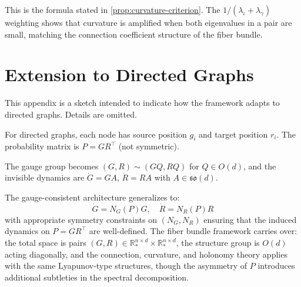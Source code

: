 \documentclass{article}
\newcommand{\RR}{\mathbb{R}}
\newcommand{\so}{\mathfrak{so}}
\theoremstyle{plain}
\theoremstyle{definition}
\theoremstyle{remark}
\begin{document}
This is the formula stated in \cref{prop:curvature-criterion}.
The $1 / (\lambda_\iota + \lambda_\gamma)$ weighting shows that curvature is amplified when both eigenvalues in a pair are small, matching the connection coefficient structure of the fiber bundle.


\section{Extension to Directed Graphs}\label{app:directed}

This appendix is a sketch intended to indicate how the framework adapts to directed graphs. Details are omitted.

For directed graphs, each node has source position $g_i$ and target position $r_i$.
The probability matrix is $P = GR^\top$ (not symmetric).

The gauge group becomes $(G, R) \sim (GQ, RQ)$ for $Q \in O(d)$, and the invisible dynamics are $\dot{G} = GA$, $\dot{R} = RA$ with $A \in \so(d)$.

The gauge-consistent architecture generalizes to:
\begin{equation}
\dot{G} = N_G(P) G, \quad \dot{R} = N_R(P) R
\end{equation}
with appropriate symmetry constraints on $(N_G, N_R)$ ensuring that the induced dynamics on $P = GR^\top$ are well-defined.
The fiber bundle framework carries over: the total space is pairs $(G, R) \in \RR_*^{n \times d} \times \RR_*^{n \times d}$, the structure group is $O(d)$ acting diagonally, and the connection, curvature, and holonomy theory applies with the same Lyapunov-type structures, though the asymmetry of $P$ introduces additional subtleties in the spectral decomposition.
\end{document}
